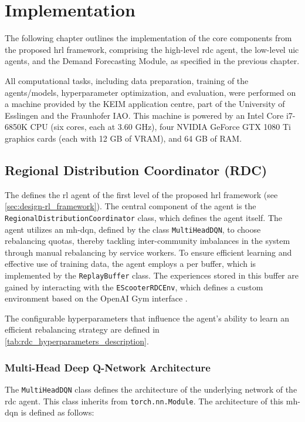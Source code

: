 \chapter{Implementation}\label{sec:implementation} %
The following chapter outlines the implementation of the core components from the proposed \gls{hrl} framework, comprising the high-level \gls{rdc} agent, the low-level \gls{uic} agents, and the Demand Forecasting Module, as specified in the previous chapter.

All computational tasks, including data preparation, training of the agents/models, hyperparameter optimization, and evaluation, were performed on a machine provided by the KEIM application centre, part of the University of Esslingen and the Fraunhofer IAO.
This machine is powered by an Intel Core i7-6850K CPU (six cores, each at 3.60 GHz), four NVIDIA GeForce GTX 1080 Ti graphics cards (each with 12 GB of VRAM), and 64 GB of RAM.

\section{Regional Distribution Coordinator (RDC)}\label{sec:implementation_rdc}
The  defines the \gls{rl} agent of the first level of the proposed \gls{hrl} framework (see \autoref{sec:design-rl_framework}).
The central component of the agent is the \texttt{RegionalDistributionCoordinator} class, which defines the agent itself.
The agent utilizes an \gls{mh-dqn}, defined by the class \texttt{MultiHeadDQN}, to choose rebalancing quotas, thereby tackling inter-community imbalances in the system through manual rebalancing by service workers.
To ensure efficient learning and effective use of training data, the agent employs a \gls{per} \cite{schaul_prioritized_2016} buffer, which is implemented by the \texttt{ReplayBuffer} class.
The experiences stored in this buffer are gained by interacting with the \texttt{EScooterRDCEnv}, which defines a custom environment based on the OpenAI Gym interface \cite{brockman_openai_2016}.

The configurable hyperparameters that influence the agent's ability to learn an efficient rebalancing strategy are defined in \autoref{tab:rdc_hyperparameters_description}.

\subsection{Multi-Head Deep Q-Network Architecture}
The \texttt{MultiHeadDQN} class defines the architecture of the underlying network of the \gls{rdc} agent.
This class inherits from \texttt{torch.nn.Module}.
The architecture of this \gls{mh-dqn} is defined as follows:

